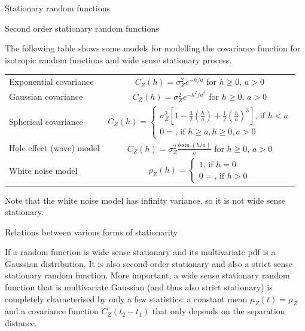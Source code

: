 \documentclass[8pt]{beamer}
\renewcommand{\emph}[1]{\textcolor{myorange}{#1}}
\begin{document}
 \begin{frame}{Stationary random functions}
     \begin{block}{Second order stationary random functions}
    \end{block}

    The following table shows some models for modelling the \emph{covariance function} for \emph{isotropic random functions} and  \emph{wide sense stationary process}. 

    \begin{center}
  \begin{tabular}{|l|c|}
    Exponential covariance & $C_Z (h) = \sigma_Z^2 e^{-h/a}$ for $h\geq 0$, $a>0$ \\ 
    Gaussian covariance         & $C_Z (h) =  \sigma_Z^2  e^{-h^2 / a^2}$  for $h\geq 0$, $a>0$ \\ 
    Spherical covariance         & $ C_Z (h) = \left\{ \begin{array}{l}  \sigma_Z^2 \left[ 1 - \frac{3}{2}\left(\frac{h}{a}\right) + \frac{1}{2}\left(\frac{h}{a}\right)^3 \right]   \text{, if } h< a  \\ 0 = \text{, if } h\geq a, h\geq 0, a>0 \end{array} \right. $ \\ 
    Hole effect (wave) model & $C_Z (h) = \sigma_Z^2 \frac{b\sin (h/a)}{h}$ for $h\geq 0$, $a>0$ \\ 
    White noise model &  $ \rho_Z (h) = \left\{ \begin{array}{l}  1 \text{, if } h=0  \\ 0 = \text{, if } h>0 \end{array} \right. $ \\ 
  \end{tabular}
    \end{center}
    Note that the \emph{white noise model} has infinity variance, so it is not \emph{wide sense stationary}. 
     \begin{block}{Relations between various forms of stationarity}
    \end{block}
    If a \emph{random function} is \emph{wide sense stationary} and its \emph{multivariate pdf} is a \emph{Gaussian distribution}, It is also second order stationary and also a strict sense \emph{stationary random function}. More important, a wide sense stationary random function that is multivariate Gaussian (and thus also strict stationary) is completely characterised by only a few statistics:  a constant \emph{mean} $\mu_Z (t) = \mu_Z$  and a \emph{covariance  function} $C_Z (t_2 - t_1)$ that only depends on the separation distance. 

\end{frame}
\end{document}
